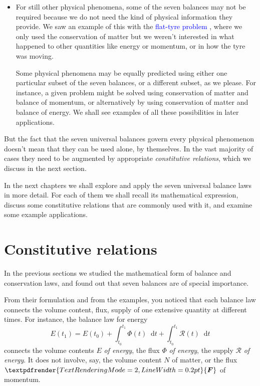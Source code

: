 \documentclass[a4paper,12pt,%
onecolumn,oneside,%
british%
]{memoir}
\renewcommand*{\bm}[1]{\textpdfrender{TextRenderingMode=2,LineWidth=0.2pt}{\boldsymbol{#1}}}
\newcommand*{\di}{\mathop{}\!\mathrm{d}}%
\renewcommand*{\|}[1][]{\nonscript\:#1\vert\nonscript\:\mathopen{}}
\newcommand*{\sect}{\S}%
\renewcommand*{\autoref}[3][\sect\,\ref]{\textcolor{blue}{#3}
\raisebox{0.6ex}{\color{blue}\miniscule%
\faIcon{angle-right}%
\;#1{#2}\;p.\,\pageref{#2}}}
\newcommand*{\yti}{t_{0}}
\newcommand*{\ytf}{t_{1}}
\newcommand*{\dt}{\di t}
\newcommand*{\yN}{N}
\newcommand*{\yE}{E}
\newcommand*{\yH}{\varPhi}%
\newcommand*{\yR}{\mathcal{R}}%
\newcommand*{\yF}{\bm{F}}
\begin{document}
\begin{itemize}[para]
\item For still other physical phenomena, some of the seven balances may not be required because we do not need the kind of physical information they provide. We saw an example of this with the \autoref{sec:example_conservation_moving}{flat-tyre problem}, where we only used the conservation of matter but we weren't interested in what happened to other quantities like energy or momentum, or in how the tyre was moving.

  Some physical phenomena may be equally predicted using either one particular subset of the seven balances, or a different subset, as we please. For instance, a given problem might be solved using conservation of matter and balance of momentum, or alternatively by using conservation of matter and balance of energy. We shall see examples of all these possibilities in later applications.
\end{itemize}

\medskip


But the fact that the seven universal balances govern every physical phenomenon doesn't mean that they can be used alone, by themselves. In the vast majority of cases they need to be augmented by appropriate \emph{constitutive relations}, which we discuss in the next section.

\medskip

In the next chapters we shall explore and apply the seven universal balance laws in more detail. For each of them we shall recall its mathematical expression, discuss some constitutive relations that are commonly used with it, and examine some example applications.


\section{Constitutive relations}
\label{sec:constitutive}

In the previous sections we studied the mathematical form of balance and conservation laws, and found out that seven balances are of special importance.

From their formulation and from the examples, you noticed that each balance law connects the volume content, flux, supply of one extensive quantity at different times. For instance, the balance law for energy
\begin{equation*}
  \yE(\ytf) = \yE(\yti)
  + \int_{\yti}^{\ytf}\!\!\yH(t)\dt
  + \int_{\yti}^{\ytf}\!\!\yR(t)\dt
\end{equation*}
connects the volume contents $\yE$ \emph{of energy}, the flux $\yH$ \emph{of energy}, the supply $\yR$ \emph{of energy}. It does not involve, say, the volume content $\yN$ of matter, or the flux $\yF$ of momentum.
\end{document}
